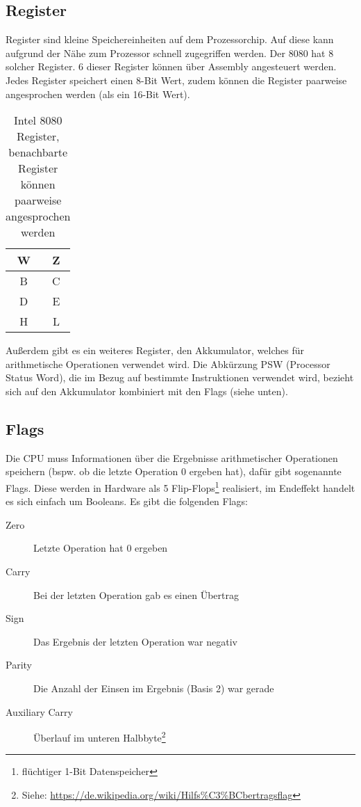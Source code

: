 \subsection{Register}

Register sind kleine Speichereinheiten auf dem Prozessorchip. Auf diese kann aufgrund der Nähe zum Prozessor schnell zugegriffen werden. Der 8080 hat 8 solcher Register.
6 dieser Register können über Assembly angesteuert werden. Jedes Register speichert einen 8-Bit Wert, zudem können die Register paarweise angesprochen werden (als ein 16-Bit Wert).

\begin{table}[h]
    \centering
    \caption{Intel 8080 Register, benachbarte Register können paarweise angesprochen werden}
    \label{tab:regs}
    \begin{tabular}{|c|c|}
        \hline
        W & Z \\\hline
        B & C \\\hline
        D & E \\\hline
        H & L \\\hline
    \end{tabular}
\end{table}

Außerdem gibt es ein weiteres Register, den Akkumulator, welches für arithmetische Operationen verwendet wird.
Die Abkürzung PSW (Processor Status Word), die im Bezug auf bestimmte Instruktionen verwendet wird, bezieht sich auf den Akkumulator kombiniert mit den Flags (siehe unten).

\subsection{Flags}\label{sec:flags}

Die CPU muss Informationen über die Ergebnisse arithmetischer Operationen speichern (bspw. ob die letzte Operation 0 ergeben hat), dafür gibt sogenannte Flags. Diese werden in Hardware als 5 Flip-Flops\footnote{flüchtiger 1-Bit Datenspeicher} realisiert, im Endeffekt handelt es sich einfach um Booleans. Es gibt die folgenden Flags:

\begin{description}
    \item[Zero] Letzte Operation hat 0 ergeben
    \item[Carry] Bei der letzten Operation gab es einen Übertrag
    \item[Sign] Das Ergebnis der letzten Operation war negativ
    \item[Parity] Die Anzahl der Einsen im Ergebnis (Basis 2) war gerade
    \item[Auxiliary Carry] Überlauf im unteren Halbbyte\footnote{Siehe: \url{https://de.wikipedia.org/wiki/Hilfs\%C3\%BCbertragsflag}}
\end{description}

